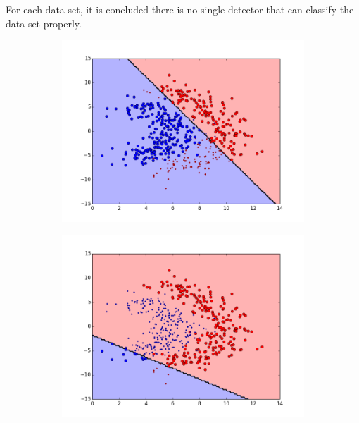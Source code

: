 For each data set, it is concluded  there is no single detector that can classify the data set properly. 

\begin{figure}[t!] %
\begin{subfigure}{0.48\textwidth}
\includegraphics[width=\linewidth]{figs/Lithuanian/20All-Classifiers}
\caption{} \label{fig:Lithuanian_all_single_a}
\end{subfigure}\hspace*{\fill}
\begin{subfigure}{0.48\textwidth}
\includegraphics[width=\linewidth]{figs/Lithuanian/43All-Classifiers}
\caption{} \label{fig:Lithuanian_all_single_b}
\end{subfigure}


\end{figure}
